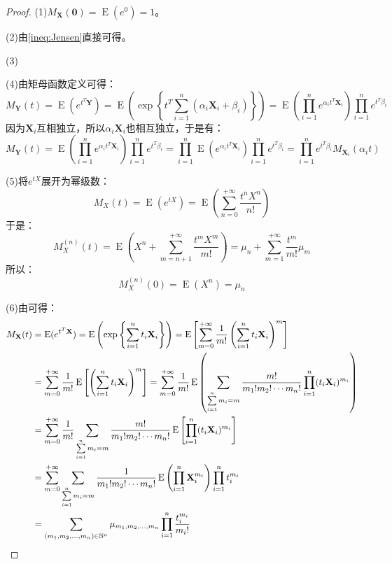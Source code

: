 \begin{proof}
	(1)$M_\mathbf{X}(\mathbf{0})=\operatorname{E}(e^0)=1$。\par
	(2)由\cref{ineq:Jensen}直接可得。\par
	(3)\par
	(4)由矩母函数定义可得：
	\begin{equation*}
		M_\mathbf{Y}(t)=\operatorname{E}(e^{t^T\mathbf{Y}})
		=\operatorname{E}\left(\exp\left\{t^T\sum_{i=1}^{n}(\alpha_i\mathbf{X}_i+\beta_i)\right\}\right)=\operatorname{E}\left(\prod_{i=1}^{n}e^{\alpha_it^T\mathbf{X}_i}\right)\prod_{i=1}^ne^{t^T\beta_i}
	\end{equation*}
	因为$\mathbf{X}_i$互相独立，所以$\alpha_i\mathbf{X}_i$也相互独立，于是有：
	\begin{equation*}
		M_\mathbf{Y}(t)=\operatorname{E}\left(\prod_{i=1}^{n}e^{\alpha_it^T\mathbf{X}_i}\right)\prod_{i=1}^ne^{t^T\beta_i}=\prod_{i=1}^{n}\operatorname{E}\left(e^{\alpha_it^T\mathbf{X}_i}\right)\prod_{i=1}^ne^{t^T\beta_i}=\prod_{i=1}^ne^{t^T\beta_i}M_{\mathbf{X}_i}(\alpha_it)
	\end{equation*}\par
	(5)将$e^{tX}$展开为幂级数：
	\begin{equation*}
		M_X(t)=\operatorname{E}(e^{tX})=\operatorname{E}\left(\sum_{n=0}^{+\infty}\frac{t^nX^n}{n!}\right)
	\end{equation*}
	于是：
	\begin{equation*}
		M_X^{(n)}(t)=\operatorname{E}\left(X^n+\sum_{m=n+1}^{+\infty}\frac{t^mX^m}{m!}\right)=\mu_n+\sum_{m=1}^{+\infty}\frac{t^m}{m!}\mu_m
	\end{equation*}
	所以：
	\begin{equation*}
		M_X^{(n)}(0)=\operatorname{E}(X^n)=\mu_n
	\end{equation*}\par
	(6)由可得：
	\begin{align*}
		M_\mathbf{X}(t)&=\operatorname{E}(e^{t^T\mathbf{X}})
		=\operatorname{E}\left(\exp\left\{\sum_{i=1}^{n}t_i\mathbf{X}_i\right\}\right)
		=\operatorname{E}\left[\sum_{m=0}^{+\infty}\frac{1}{m!}\left(\sum_{i=1}^{n}t_i\mathbf{X}_i\right)^m\right] \\
		&=\sum_{m=0}^{+\infty}\frac{1}{m!}\operatorname{E}\left[\left(\sum_{i=1}^{n}t_i\mathbf{X}_i\right)^m\right]
		=\sum_{m=0}^{+\infty}\frac{1}{m!}\operatorname{E}\left(\sum_{\sum\limits_{i=1}^{n}m_i=m}\frac{m!}{m_1!m_2!\cdots m_n!}\prod_{i=1}^{n}(t_i\mathbf{X}_i)^{m_i}\right) \\
		&=\sum_{m=0}^{+\infty}\frac{1}{m!}\sum_{\sum\limits_{i=1}^{n}m_i=m}\frac{m!}{m_1!m_2!\cdots m_n!}\operatorname{E}\left[\prod_{i=1}^{n}(t_i\mathbf{X}_i)^{m_i}\right] \\
		&=\sum_{m=0}^{+\infty}\sum_{\sum\limits_{i=1}^{n}m_i=m}\frac{1}{m_1!m_2!\cdots m_n!}\operatorname{E}\left(\prod_{i=1}^{n}\mathbf{X}_i^{m_i}\right)\prod_{i=1}^{n}t_i^{m_i} \\
		&=\sum_{(m_1, m_2, \dots, m_{n})\in\mathbb{N}^n}\mu_{m_1, m_2, \dots, m_{n}}\prod_{i=1}^{n}\frac{t_i^{m_i}}{m_i!}\qedhere
	\end{align*}
\end{proof}

